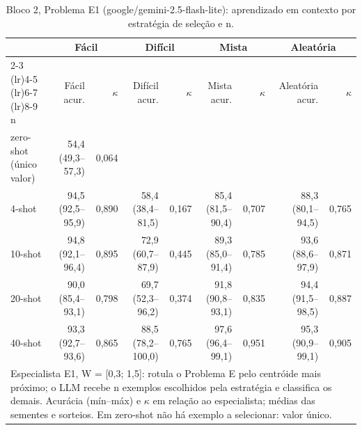\begin{table}[htbp]
\centering
\small
\caption{Bloco 2, Problema E1 (google/gemini-2.5-flash-lite): aprendizado em contexto por estratégia de seleção e n.}
\label{tab:bloco2_E1_faseE_estrategia_x_nshot_flashlite}
\begin{tabular}{lrrrrrrrr}
\toprule
 & \multicolumn{2}{c}{Fácil} & \multicolumn{2}{c}{Difícil} & \multicolumn{2}{c}{Mista} & \multicolumn{2}{c}{Aleatória} \\ \cmidrule(lr){2-3} \cmidrule(lr){4-5} \cmidrule(lr){6-7} \cmidrule(lr){8-9}
n & Fácil acur. & $\kappa$ & Difícil acur. & $\kappa$ & Mista acur. & $\kappa$ & Aleatória acur. & $\kappa$ \\
\midrule
zero-shot (único valor) & 54,4 (49,3–57,3) & 0,064 &  &  &  &  &  &  \\
4-shot & 94,5 (92,5–95,9) & 0,890 & 58,4 (38,4–81,5) & 0,167 & 85,4 (81,5–90,4) & 0,707 & 88,3 (80,1–94,5) & 0,765 \\
10-shot & 94,8 (92,1–96,4) & 0,895 & 72,9 (60,7–87,9) & 0,445 & 89,3 (85,0–91,4) & 0,785 & 93,6 (88,6–97,9) & 0,871 \\
20-shot & 90,0 (85,4–93,1) & 0,798 & 69,7 (52,3–96,2) & 0,374 & 91,8 (90,8–93,1) & 0,835 & 94,4 (91,5–98,5) & 0,887 \\
40-shot & 93,3 (92,7–93,6) & 0,865 & 88,5 (78,2–100,0) & 0,765 & 97,6 (96,4–99,1) & 0,951 & 95,3 (90,9–99,1) & 0,905 \\
\bottomrule
\multicolumn{9}{p{0.95\linewidth}}{\footnotesize Especialista E1, W = [0,3; 1,5]: rotula o Problema E pelo centróide mais próximo; o LLM recebe n exemplos escolhidos pela estratégia e classifica os demais. Acurácia (mín–máx) e $\kappa$ em relação ao especialista; médias das sementes e sorteios. Em zero-shot não há exemplo a selecionar: valor único.} \\
\end{tabular}
\end{table}
